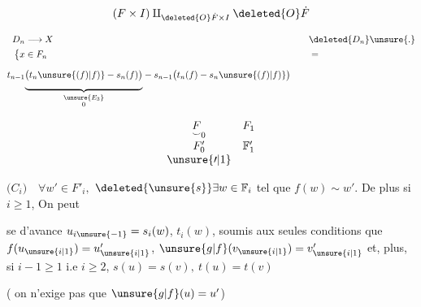 \[
(F\times I)\mathbin{\amalg}_{\deleted{O}\dot F\times I}\deleted{O}\dot F
\]


\[
\begin{aligned}
D_n&\longrightarrow X &\quad&\deleted{D_n}\unsure{.}\\
\bigl\{x&\in F_n && =\\
t_{n-1}{}&
\underset{\substack{\unsure{E_3}\hfill\\0}}{\underbrace{\vphantom{\bigg|}\bigl(t_n\unsure{(f)|f)}-s_n(f)\bigr)}}
-s_{n-1}\bigl(t_n(f)-s_n\unsure{(f)|f)}\bigr)&&
\end{aligned}
\]

\[
\begin{array}{cc}
\underset{\smile}{F}_0 & F_1\\[.6em]
F'_0 & \mathbb F'_1\\
\unsure{\prime|1}&
\end{array}
\]

\begin{flushright}
\begin{minipage}{.74\linewidth}
\(\bigl(C_i\bigr)\quad\forall w'\in F'_i,\)
 \(\deleted{\unsure{s}}\exists w\in\mathbb F_i\) tel que
\(f(w)\sim w'\). De plus si \(i\geq1\), On peut
\par\noindent{}\begin{minipage}{.89\linewidth}
se 
d'avance \(u_{i\unsure{-1}}=s_i(w)\), \(t_i(w)\),
 soumis aux seules conditions  que
\(f(u_{\unsure{i|1}})=u'_{\unsure{i|1}}\), 
\(\unsure{g|f}(v_{\unsure{i|1}})=v'_{\unsure{i|1}}\)
et,  plus, si \(i-1\geq1\) i.e \(i\geq2\), 
\(s(u)=s(v),\ t(u)=t(v)\)
\end{minipage}

( on n'exige pas que \(\unsure{g|f}(u)=u'\))
\end{minipage}
\end{flushright}

